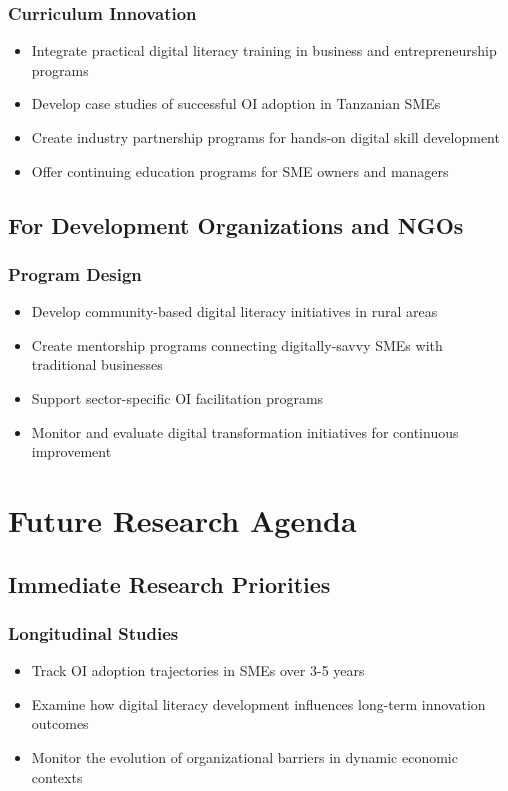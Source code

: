 \subsubsection{Curriculum Innovation}
\begin{itemize}
    \item Integrate practical digital literacy training in business and entrepreneurship programs
    \item Develop case studies of successful OI adoption in Tanzanian SMEs
    \item Create industry partnership programs for hands-on digital skill development
    \item Offer continuing education programs for SME owners and managers
\end{itemize}

\subsection{For Development Organizations and NGOs}

\subsubsection{Program Design}
\begin{itemize}
    \item Develop community-based digital literacy initiatives in rural areas
    \item Create mentorship programs connecting digitally-savvy SMEs with traditional businesses
    \item Support sector-specific OI facilitation programs
    \item Monitor and evaluate digital transformation initiatives for continuous improvement
\end{itemize}

\section{Future Research Agenda}

\subsection{Immediate Research Priorities}

\subsubsection{Longitudinal Studies}
\begin{itemize}
    \item Track OI adoption trajectories in SMEs over 3-5 years
    \item Examine how digital literacy development influences long-term innovation outcomes
    \item Monitor the evolution of organizational barriers in dynamic economic contexts
\end{itemize}

